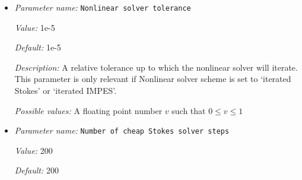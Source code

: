 \begin{itemize}
{\it Value:} IMPES


{\it Default:} IMPES


{\it Description:} The kind of scheme used to resolve the nonlinearity in the system. 'IMPES' is the classical IMplicit Pressure Explicit Saturation scheme in which ones solves the temperatures and Stokes equations exactly once per time step, one after the other. The `iterated IMPES' scheme iterates this decoupled approach by alternating the solution of the temperature and Stokes systems. The `iterated Stokes' scheme solves the temperature equation once at the beginning of each time step and then iterates out the solution of the Stokes equation. The 'Stokes only' scheme only solves the Stokes system and ignores compositions and the temperature equation (careful, the material model must not depend on the temperature; mostly useful for Stokes benchmarks). The 'Advection only' scheme only solves the temperature and other advection systems and instead of solving for the Stokes system, a prescribed velocity and pressure is used.


{\it Possible values:} Any one of IMPES, iterated IMPES, iterated Stokes, Newton Stokes, Stokes only, Advection only
\item {\it Parameter name:} {\tt Nonlinear solver tolerance}
\label{parameters:Nonlinear solver tolerance}


{\it Value:} 1e-5


{\it Default:} 1e-5


{\it Description:} A relative tolerance up to which the nonlinear solver will iterate. This parameter is only relevant if Nonlinear solver scheme is set to `iterated Stokes' or `iterated IMPES'.


{\it Possible values:} A floating point number $v$ such that $0 \leq v \leq 1$
\item {\it Parameter name:} {\tt Number of cheap Stokes solver steps}
\label{parameters:Number of cheap Stokes solver steps}


{\it Value:} 200


{\it Default:} 200



\end{itemize}
